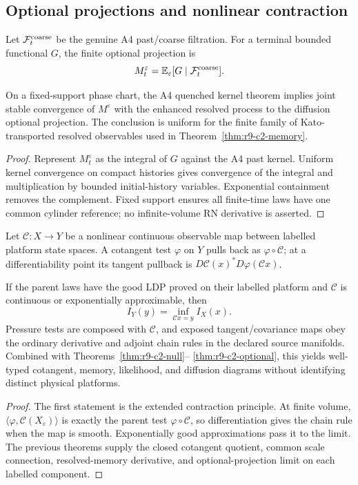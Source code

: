 \subsection{Optional projections and nonlinear contraction}

Let $\mathcal F_t^{\rm coarse}$ be the genuine A4 past/coarse filtration.
For a terminal bounded functional $G$, the finite optional projection is
\[
 M_t^\varepsilon
 =\mathbb E_\varepsilon[G\mid\mathcal F_t^{\rm coarse}].
\]

\begin{theorem}
\label{thm:r9-c2-optional}
On a fixed-support phase chart, the A4 quenched kernel theorem implies joint
stable convergence of $M^\varepsilon$ with the enhanced resolved process
to the diffusion optional projection.  The conclusion is uniform for the
finite family of Kato-transported resolved observables used in
Theorem~\ref{thm:r9-c2-memory}.
\end{theorem}

\begin{proof}
Represent $M_t^\varepsilon$ as the integral of $G$ against the A4 past
kernel.  Uniform kernel convergence on compact histories gives convergence of
the integral and multiplication by bounded initial-history variables.
Exponential containment removes the complement.  Fixed support ensures all
finite-time laws have one common cylinder reference; no infinite-volume RN
derivative is asserted.
\end{proof}

Let $\mathcal C:X\to Y$ be a nonlinear continuous observable map between
labelled platform state spaces.  A cotangent test $\varphi$ on $Y$ pulls back
as $\varphi\circ\mathcal C$; at a differentiability point its tangent
pullback is $D\mathcal C(x)^*D\varphi(\mathcal Cx)$.

\begin{theorem}
\label{thm:r9-c2-main}
If the parent laws have the good LDP proved on their labelled platform and
$\mathcal C$ is continuous or exponentially approximable, then
\[
 I_Y(y)=\inf_{\mathcal Cx=y}I_X(x).
\]
Pressure tests are composed with $\mathcal C$, and exposed tangent/covariance
maps obey the ordinary derivative and adjoint chain rules in the declared
source manifolds.  Combined with Theorems~\ref{thm:r9-c2-null}--
\ref{thm:r9-c2-optional}, this yields well-typed cotangent, memory, likelihood,
and diffusion diagrams without identifying distinct physical platforms.
\end{theorem}

\begin{proof}
The first statement is the extended contraction principle.  At finite volume,
$\langle\varphi,\mathcal C(X_\varepsilon)\rangle$ is exactly the parent
test $\varphi\circ\mathcal C$, so differentiation gives the chain rule when
the map is smooth.  Exponentially good approximations pass it to the limit.
The previous theorems supply the closed cotangent quotient, common scale
connection, resolved-memory derivative, and optional-projection limit on each
labelled component.
\end{proof}
